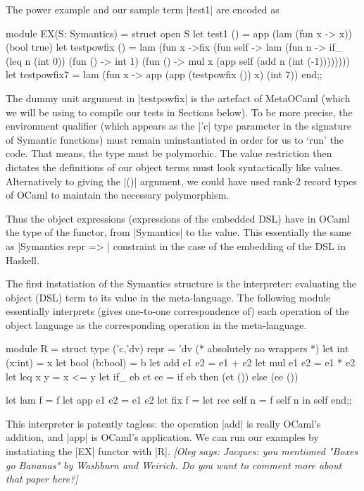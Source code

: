 \documentclass[preprint]{sigplanconf}
\newcommand{\oleg}[1]{{\it [Oleg says: #1]}}
\begin{document}
The power example and our sample term |test1| are encoded as
\begin{code}
module EX(S: Symantics) = struct
 open S
 let test1 () = app (lam (fun x -> x)) (bool true)
 let testpowfix () = 
   lam (fun x ->fix (fun self -> lam (fun n ->
         if_ (leq n (int 0)) (fun () -> int 1)
             (fun () -> mul x (app self 
                                   (add n (int (-1))))))))
 let testpowfix7 = 
    lam (fun x -> app (app (testpowfix ()) x) (int 7))
end;;
\end{code}
The dummy unit argument in |testpowfix| is the artefact of MetaOCaml
(which we will be using to compile our tests in Sections below). To be
more precise, the environment qualifier (which appears as the |'c|
type parameter in the signature of Symantic functions) must remain
uninstantiated in order for us to `run' the code. That means, the type
must be polymorhic. The value restriction then dictates 
the definitions of our object terms must look syntactically like
values. Alternatively to giving the |()| argument, we could have used
rank-2 record types of OCaml to maintain the necessary polymorphism.

Thus the object expressions (expressions of the embedded DSL) have in
OCaml the type of the functor, from |Symantics| to the value. This
essentially the same as |Symantics repr => | constraint in the case of
the embedding of the DSL in Haskell.

The first instatiation of the Symantics structure is the interpreter:
evaluating the object (DSL) term to its value in the meta-language. 
The following module essentially interprets (gives one-to-one
correspondence of) each operation of the object language as the
corresponding operation in the meta-language.
\begin{code}
module R  = struct
  type ('c,'dv) repr = 'dv    (* absolutely no wrappers *)
  let int (x:int) = x
  let bool (b:bool) = b
  let add e1 e2 = e1 + e2
  let mul e1 e2 = e1 * e2
  let leq x y = x <= y
  let if_ eb et ee = if eb then (et ()) else (ee ())

  let lam f = f
  let app e1 e2 = e1 e2
  let fix f = let rec self n = f self n in self
end;;
\end{code}

This interpreter is patently tagless: the operation |add| is really
OCaml's addition, and |app| is OCaml's application. We can run our
examples by instatiating the |EX| functor with |R|.
\oleg{Jacques: you mentioned "Boxes go Bananas" by Washburn and
  Weirich. Do you want to comment more about that paper here?}
\end{document}
